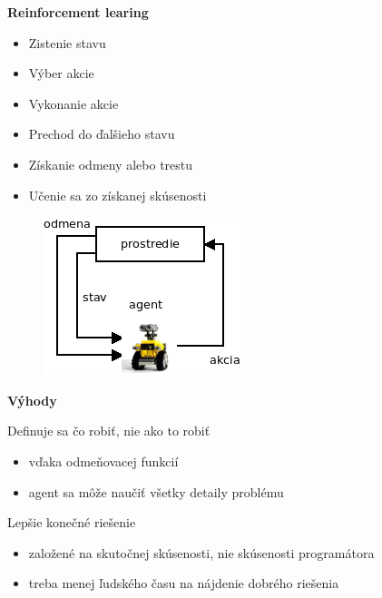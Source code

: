 \documentclass[xcolor=dvipsnames]{beamer}
\begin{document}
\begin{frame}{\bf Reinforcement learing}

\begin{minipage}{.5\textwidth}

\begin{itemize}
  \item Zistenie stavu
  \item Výber akcie
  \item Vykonanie akcie
  \item Prechod do ďalšieho stavu
  \item Získanie odmeny alebo trestu
  \item Učenie sa zo získanej skúsenosti
\end{itemize}

  \end{minipage}%
\begin{minipage}{.5\textwidth}

  \begin{figure}[!htb]
  \centering
  \includegraphics[scale=.8]{../diagrams/agent.png}
  \end{figure}

\end{minipage}

\end{frame}

\begin{frame}{\bf Výhody}

Definuje sa čo robiť, nie ako to robiť
\begin{itemize}
\item vďaka odmeňovacej funkcií
\item agent sa môže naučiť všetky detaily problému
\end{itemize}

Lepšie konečné riešenie
\begin{itemize}
\item založené na skutočnej skúsenosti, nie skúsenosti programátora
\item treba menej ľudského času na nájdenie dobrého riešenia
\end{itemize}


\end{frame}
\end{document}
